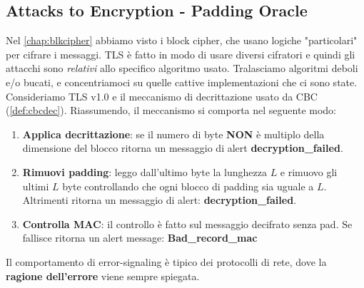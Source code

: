 \subsection{Attacks to Encryption - Padding Oracle}
Nel \cref{chap:blkcipher} abbiamo visto i block cipher, che usano logiche "particolari" per cifrare i messaggi. TLS è fatto in modo di usare diversi cifratori e quindi gli attacchi sono \textit{relativi} allo specifico algoritmo usato. Tralasciamo algoritmi deboli e/o bucati, e concentriamoci su quelle cattive implementazioni che ci sono state.\\
Consideriamo TLS v1.0 e il meccanismo di decrittazione usato da CBC (\cref{def:cbcdec}). Riassumendo, il meccanismo si comporta nel seguente modo:
\begin{enumerate}
    \item \textbf{Applica decrittazione}: se il numero di byte \textbf{NON} è multiplo della dimensione del blocco ritorna un messaggio di alert \textbf{decryption\_failed}.
    \item \textbf{Rimuovi padding}: leggo dall'ultimo byte la lunghezza $L$ e rimuovo gli ultimi $L$ byte controllando che ogni blocco di padding sia uguale a $L$. Altrimenti ritorna un messaggio di alert: \textbf{decryption\_failed}.
    \item \textbf{Controlla MAC}: il controllo è fatto sul messaggio decifrato senza pad. Se fallisce ritorna un alert message: \textbf{Bad\_record\_mac}
\end{enumerate}
\begin{remark}
Il comportamento di error-signaling è tipico dei protocolli di rete, dove la \textbf{ragione dell'errore} viene sempre spiegata. 
\end{remark}
